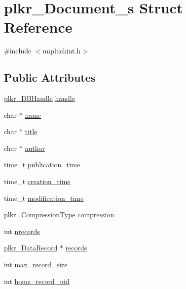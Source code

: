 \hypertarget{structplkr__Document__s}{\section{plkr\+\_\+\+Document\+\_\+s Struct Reference}
\label{structplkr__Document__s}
}


{\ttfamily \#include $<$unpluckint.\+h$>$}

\subsection*{Public Attributes}
\begin{DoxyCompactItemize}
\item 
\hyperlink{unpluck_8h_a74fbfe35b87f9a4c762e6a099cb849d5}{plkr\+\_\+\+D\+B\+Handle} \hyperlink{structplkr__Document__s_ae1a048bf4797c696d6313c1e08ce3577}{handle}
\item 
char $\ast$ \hyperlink{structplkr__Document__s_a40733c5478612b5565a4e0155a01bdc6}{name}
\item 
char $\ast$ \hyperlink{structplkr__Document__s_ab71be4337a9081768a49c7a0849469c7}{title}
\item 
char $\ast$ \hyperlink{structplkr__Document__s_a8347ae3e4ab58977de561cdc2877b93f}{author}
\item 
time\+\_\+t \hyperlink{structplkr__Document__s_a29ac543a7a36087e946457ff8709517b}{publication\+\_\+time}
\item 
time\+\_\+t \hyperlink{structplkr__Document__s_a0c43dd82cb77cbf9f5d879e521e1d4ee}{creation\+\_\+time}
\item 
time\+\_\+t \hyperlink{structplkr__Document__s_ab595a6fc74557f08e01385622469183f}{modification\+\_\+time}
\item 
\hyperlink{unpluckint_8h_a75c86a2bd8e62f0c036a6389a1157ea1}{plkr\+\_\+\+Compression\+Type} \hyperlink{structplkr__Document__s_aee6a7d3edd70fee86668477c05a45bd1}{compression}
\item 
int \hyperlink{structplkr__Document__s_a133abbdd399b433991b5e561339990f7}{nrecords}
\item 
\hyperlink{unpluckint_8h_a50cfb039ab6227812a2ee8b8c105ef87}{plkr\+\_\+\+Data\+Record} $\ast$ \hyperlink{structplkr__Document__s_a5cebe36965c1e730ac63af3a075df34a}{records}
\item 
int \hyperlink{structplkr__Document__s_af5e11a562c37e9684e4930b776170f85}{max\+\_\+record\+\_\+size}
\item 
int \hyperlink{structplkr__Document__s_a855d2555348d33aa63c23324fca29775}{home\+\_\+record\+\_\+uid}

\end{DoxyCompactItemize}
